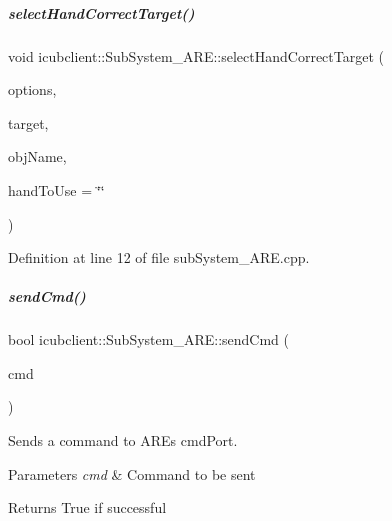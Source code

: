 \mbox{\label{group__icubclient__subsystems_acd77a648ae64caad1620ad082e81d481}} 
\subparagraph{\texorpdfstring{select\+Hand\+Correct\+Target()}{selectHandCorrectTarget()}}
{\footnotesize\ttfamily void icubclient\+::\+Sub\+System\+\_\+\+A\+R\+E\+::select\+Hand\+Correct\+Target (\begin{DoxyParamCaption}\item[{yarp\+::os\+::\+Bottle \&}]{options,  }\item[{yarp\+::sig\+::\+Vector\+Of$<$ double $>$ \&}]{target,  }\item[{const std\+::string \&}]{obj\+Name,  }\item[{const std\+::string}]{hand\+To\+Use = {\ttfamily \char`\"{}\char`\"{}} }\end{DoxyParamCaption})}



Definition at line 12 of file sub\+System\+\_\+\+A\+R\+E.\+cpp.

\mbox{\label{group__icubclient__subsystems_a5e8900944781979714a8cc5fb97f7ad4}} 
\subparagraph{\texorpdfstring{send\+Cmd()}{sendCmd()}}
{\footnotesize\ttfamily bool icubclient\+::\+Sub\+System\+\_\+\+A\+R\+E\+::send\+Cmd (\begin{DoxyParamCaption}\item[{const yarp\+::os\+::\+Bottle \&}]{cmd }\end{DoxyParamCaption})\hspace{0.3cm}{\ttfamily [protected]}}



Sends a command to A\+RE\textquotesingle{}s cmd\+Port. 


\begin{DoxyParams}{Parameters}
{\em cmd} & Command to be sent \\
\hline
\end{DoxyParams}
\begin{DoxyReturn}{Returns}
True if successful 
\end{DoxyReturn}


